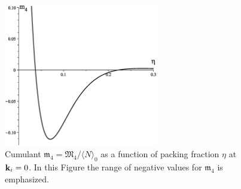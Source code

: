 \begin{figure}[htbp]
	\includegraphics[width=0.6\textwidth,angle=0]{M4_at_k_equals_0_as_function_of_eta}
	\caption{Cumulant $\mathfrak{m}_4 = \mathfrak{M}_4/\langle N \rangle_0$ as a function of packing fraction $\eta$ at $\vb k_i = 0$. In this Figure the range of negative values for $\mathfrak{m}_4$ is emphasized.}
	\label{m4_fig1}
\end{figure}

